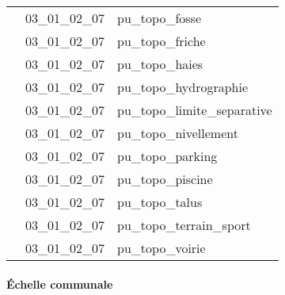 \documentclass[12pt,titlepage,oneside]{book}
\begin{document}
\begin{supertabular}{|p{10cm}|c|p{15cm}|}
                    & 03\_01\_02\_07 & pu\_topo\_fosse\\


                    & 03\_01\_02\_07 & pu\_topo\_friche\\


                    & 03\_01\_02\_07 & pu\_topo\_haies\\


                    & 03\_01\_02\_07 & pu\_topo\_hydrographie\\


                    & 03\_01\_02\_07 & pu\_topo\_limite\_separative\\


                    & 03\_01\_02\_07 & pu\_topo\_nivellement\\


                    & 03\_01\_02\_07 & pu\_topo\_parking\\


                    & 03\_01\_02\_07 & pu\_topo\_piscine\\


                    & 03\_01\_02\_07 & pu\_topo\_talus\\


                    & 03\_01\_02\_07 & pu\_topo\_terrain\_sport\\


                    & 03\_01\_02\_07 & pu\_topo\_voirie\\
\hline
\end{supertabular}


\paragraph{Échelle communale}
\noindent
\vspace{\baselineskip}
\end{document}
